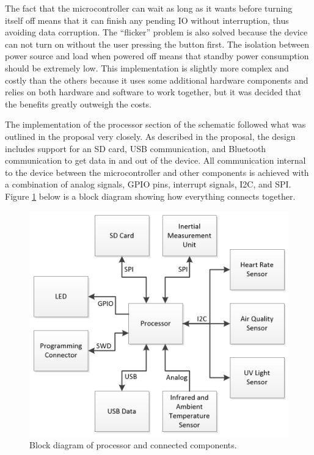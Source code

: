 The fact that the microcontroller can wait as long as it wants before turning 
itself off means that it can finish any pending IO without interruption, thus
avoiding data corruption. The “flicker” problem is also solved because the device 
can not turn on without the user pressing the button first. The isolation 
between power source and load when powered off means that standby power 
consumption should be extremely low. This implementation is slightly more 
complex and costly than the others because it uses some additional hardware 
components and relies on both hardware and software to work together, but it 
was decided that the benefits greatly outweigh the costs.

The implementation of the processor section of the schematic followed what was 
outlined in the proposal very closely. As described in 
the proposal, the design includes support for an SD card, USB communication, 
and Bluetooth communication to get data in and out of the device. All 
communication internal to the device between the microcontroller and other 
components is achieved with a combination of analog signals, GPIO pins, 
interrupt signals, I2C, and SPI. Figure \ref{fig:BlockDiagram_Processor} below 
is a block diagram showing how everything connects together.

\begin{figure}[!htb]
\centering
\includegraphics[width=\textwidth]{images/BlockDiagram_Processor.png}
\caption{Block diagram of processor and connected components.}
\label{fig:BlockDiagram_Processor}
\end{figure}

